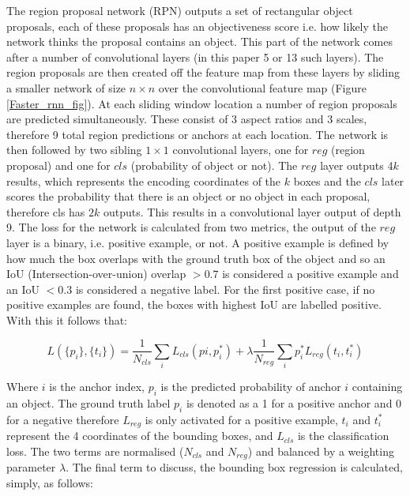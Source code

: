 \documentclass[11pt,twoside]{report}
\begin{document}
The region proposal network (RPN) outputs a set of rectangular object proposals, each of these proposals has an objectiveness score i.e. how likely the network thinks the proposal contains an object. This part of the network comes after a number of convolutional layers (in this paper 5 or 13 such layers). The region proposals are then created off the feature map from these layers by sliding a smaller network of size $n \times n$ over the convolutional feature map (Figure \ref{Faster_rnn_fig}). At each sliding window location a number of region proposals are predicted simultaneously. These consist of 3 aspect ratios and 3 scales, therefore 9 total region predictions or anchors at each location. The network is then followed by two sibling $1 \times 1$ convolutional layers, one for $reg$ (region proposal) and one for $cls$ (probability of object or not). The $reg$ layer outputs 4$k$ results, which represents the encoding coordinates of the $k$ boxes and the $cls$ later scores the probability that there is an object or no object in each proposal, therefore cls has $2k$ outputs. This results in a convolutional layer output of depth 9.
\newline \newline
The loss for the network is calculated from two metrics, the output of the $reg$ layer is a binary, i.e. positive example, or not. A positive example is defined by how much the box overlaps with the ground truth box of the object and so an IoU (Intersection-over-union) overlap $> 0.7$ is considered a positive example and an IoU $< 0.3$ is considered a negative label. For the first positive case, if no positive examples are found, the boxes with highest IoU  are labelled positive. With this it follows that:

\begin{equation}
\label{multi-task_loss_fast_rcnn}
L(\{p_{i}\},\{t_{i}\}) = \frac{1}{N_{cls}} \sum_{i} L_{cls}(p{i},p_{i}^{*}) + \lambda \frac{1}{N_{reg}} \sum_{i}p_{i}^{*} L_{reg}(t_{i},t_{i}^{*})
\end{equation}

Where $i$ is the anchor index, $p_{i}$ is the predicted probability of anchor $i$ containing an object. The ground truth label $p_{i}$ is denoted as a 1 for a positive anchor and 0 for a negative therefore $L_{reg}$ is only activated for a positive example, $t_{i}$ and $t_{i}^{*}$ represent the 4 coordinates of the bounding boxes, and $L_{cls}$ is the classification loss. The two terms are normalised ($N_{cls}$ and $N_{reg}$) and balanced by a weighting parameter $\lambda$. The final term to discuss, the bounding box regression is calculated, simply, as follows:
\end{document}
